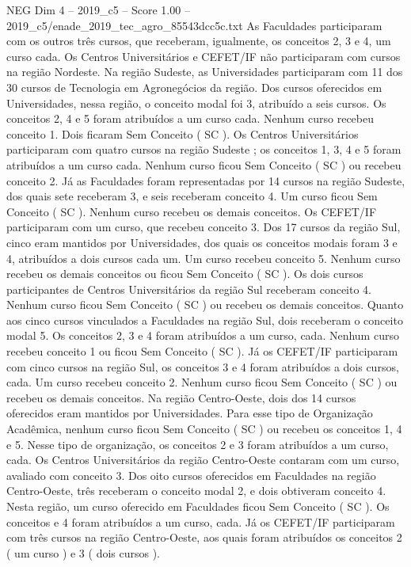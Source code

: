 \begin{textsample}{NEG Dim 4 – 2019\_c5 – Score 1.00 – 2019\_c5/enade\_2019\_tec\_agro\_85543dcc5c.txt}
As Faculdades participaram com os outros três cursos, que receberam, igualmente, os conceitos 2, 3 e 4, um curso cada.
Os Centros Universitários e CEFET/IF não participaram com cursos na região Nordeste.
Na região Sudeste, as Universidades participaram com 11 dos 30 cursos de Tecnologia em Agronegócios da região.
Dos cursos oferecidos em Universidades, nessa região, o conceito modal foi 3, atribuído a seis cursos.
Os conceitos 2, 4 e 5 foram atribuídos a um curso cada.
Nenhum curso recebeu conceito 1.
Dois ficaram Sem Conceito ( SC ).
Os Centros Universitários participaram com quatro cursos na região Sudeste ; os conceitos 1, 3, 4 e 5 foram atribuídos a um curso cada.
Nenhum curso ficou Sem Conceito ( SC ) ou recebeu conceito 2.
Já as Faculdades foram representadas por 14 cursos na região Sudeste, dos quais sete receberam 3, e seis receberam conceito 4.
Um curso ficou Sem Conceito ( SC ).
Nenhum curso recebeu os demais conceitos.
Os CEFET/IF participaram com um curso, que recebeu conceito 3.
Dos 17 cursos da região Sul, cinco eram mantidos por Universidades, dos quais os conceitos modais foram 3 e 4, atribuídos a dois cursos cada um.
Um curso recebeu conceito 5.
Nenhum curso recebeu os demais conceitos ou ficou Sem Conceito ( SC ).
Os dois cursos participantes de Centros Universitários da região Sul receberam conceito 4.
Nenhum curso ficou Sem Conceito ( SC ) ou recebeu os demais conceitos.
Quanto aos cinco cursos vinculados a Faculdades na região Sul, dois receberam o conceito modal 5.
Os conceitos 2, 3 e 4 foram atribuídos a um curso, cada.
Nenhum curso recebeu conceito 1 ou ficou Sem Conceito ( SC ).
Já os CEFET/IF participaram com cinco cursos na região Sul, os conceitos 3 e 4 foram atribuídos a dois cursos, cada.
Um curso recebeu conceito 2.
Nenhum curso ficou Sem Conceito ( SC ) ou recebeu os demais conceitos.
Na região Centro-Oeste, dois dos 14 cursos oferecidos eram mantidos por Universidades.
Para esse tipo de Organização Acadêmica, nenhum curso ficou Sem Conceito ( SC ) ou recebeu os conceitos 1, 4 e 5.
Nesse tipo de organização, os conceitos 2 e 3 foram atribuídos a um curso, cada.
Os Centros Universitários da região Centro-Oeste contaram com um curso, avaliado com conceito 3.
Dos oito cursos oferecidos em Faculdades na região Centro-Oeste, três receberam o conceito modal 2, e dois obtiveram conceito 4.
Nesta região, um curso oferecido em Faculdades ficou Sem Conceito ( SC ).
Os conceitos e 4 foram atribuídos a um curso, cada.
Já os CEFET/IF participaram com três cursos na região Centro-Oeste, aos quais foram atribuídos os conceitos 2 ( um curso ) e 3 ( dois cursos ).

\end{textsample}
